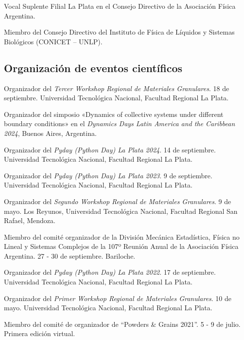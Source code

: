    Vocal Suplente Filial La Plata en el Consejo Directivo de la Asociación Física Argentina.
  
   Miembro del Consejo Directivo del Instituto de Física de Líquidos y Sistemas Biológicos (CONICET -- UNLP).
  


\subsection{Organización de eventos científicos}

 Organizador del \textit{Tercer Workshop Regional de Materiales Granulares}. 18 de septiembre. Universidad Tecnológica Nacional, Facultad Regional La Plata.

 Organizador del simposio «Dynamics of collective systems under different boundary conditions» en el \textit{Dynamics Days Latin America and the Caribbean 2024}, Buenos Aires, Argentina.

 Organizador del \textit{Pyday (Python Day) La Plata 2024}. 14 de septiembre. Universidad Tecnológica Nacional, Facultad Regional La Plata.

 Organizador del \textit{Pyday (Python Day) La Plata 2023}. 9 de septiembre. Universidad Tecnológica Nacional, Facultad Regional La Plata.

 Organizador del \textit{Segundo Workshop Regional de Materiales Granulares}. 9 de mayo. Los Reyunos, Universidad Tecnológica Nacional, Facultad Regional San Rafael, Mendoza.

 Miembro del comité organizador de la División Mecánica Estadística, Física no Lineal y Sistemas Complejos de la 107º Reunión Anual de la Asociación Física Argentina. 27 - 30 de septiembre. Bariloche.

 Organizador del \textit{Pyday (Python Day) La Plata 2022}. 17 de septiembre. Universidad Tecnológica Nacional, Facultad Regional La Plata.

 Organizador del \textit{Primer Workshop Regional de Materiales Granulares}. 10 de mayo. Universidad Tecnológica Nacional, Facultad Regional La Plata.

 Miembro del comité de organizador de ``Powders \& Grains 2021''. 5 - 9 de julio. Primera edición virtual.

